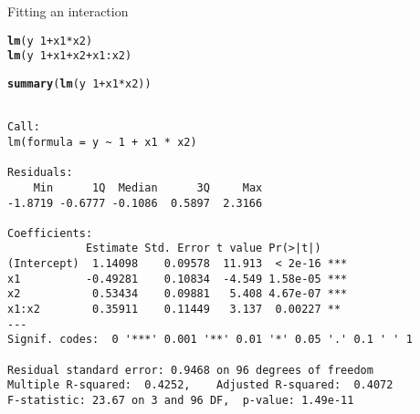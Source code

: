 \documentclass[10pt]{beamer}\usepackage[]{graphicx}\usepackage[]{color}
\makeatletter
\newcommand{\hlnum}[1]{\textcolor[rgb]{0.686,0.059,0.569}{#1}}%
\newcommand{\hlopt}[1]{\textcolor[rgb]{0,0,0}{#1}}%
\newcommand{\hlstd}[1]{\textcolor[rgb]{0.345,0.345,0.345}{#1}}%
\newcommand{\hlkwd}[1]{\textcolor[rgb]{0.737,0.353,0.396}{\textbf{#1}}}%
\newenvironment{kframe}{%
 \def\at@end@of@kframe{}%
 \ifinner\ifhmode%
  \def\at@end@of@kframe{\end{minipage}}%
  \begin{minipage}{\columnwidth}%
 \fi\fi%
 \def\FrameCommand##1{\hskip\@totalleftmargin \hskip-\fboxsep
 \colorbox{shadecolor}{##1}\hskip-\fboxsep
     \hskip-\linewidth \hskip-\@totalleftmargin \hskip\columnwidth}%
 \MakeFramed {\advance\hsize-\width
   \@totalleftmargin\z@ \linewidth\hsize
   \@setminipage}}%
 {\par\unskip\endMakeFramed%
 \at@end@of@kframe}
\newenvironment{knitrout}{}{} %
\makeatother
\begin{document}
\begin{frame}[fragile]{Fitting an interaction}

    
\begin{knitrout}\small
{}\color{fgcolor}\begin{kframe}
\begin{alltt}
  \hlkwd{lm}\hlstd{(y} \hlopt{~} \hlnum{1} \hlopt{+} \hlstd{x1} \hlopt{*} \hlstd{x2)}
  \hlkwd{lm}\hlstd{(y} \hlopt{~} \hlnum{1} \hlopt{+} \hlstd{x1} \hlopt{+} \hlstd{x2} \hlopt{+} \hlstd{x1}\hlopt{:}\hlstd{x2)}
\end{alltt}
\end{kframe}
\end{knitrout}
  \pause
\begin{knitrout}\small
{}\color{fgcolor}\begin{kframe}
\begin{alltt}
  \hlkwd{summary}\hlstd{(}\hlkwd{lm}\hlstd{(y}\hlopt{~} \hlnum{1} \hlopt{+} \hlstd{x1}\hlopt{*}\hlstd{x2))}
\end{alltt}
\begin{verbatim}

Call:
lm(formula = y ~ 1 + x1 * x2)

Residuals:
    Min      1Q  Median      3Q     Max 
-1.8719 -0.6777 -0.1086  0.5897  2.3166 

Coefficients:
            Estimate Std. Error t value Pr(>|t|)    
(Intercept)  1.14098    0.09578  11.913  < 2e-16 ***
x1          -0.49281    0.10834  -4.549 1.58e-05 ***
x2           0.53434    0.09881   5.408 4.67e-07 ***
x1:x2        0.35911    0.11449   3.137  0.00227 ** 
---
Signif. codes:  0 '***' 0.001 '**' 0.01 '*' 0.05 '.' 0.1 ' ' 1

Residual standard error: 0.9468 on 96 degrees of freedom
Multiple R-squared:  0.4252,	Adjusted R-squared:  0.4072 
F-statistic: 23.67 on 3 and 96 DF,  p-value: 1.49e-11
\end{verbatim}
\end{kframe}
\end{knitrout}
\end{frame}
\end{document}
